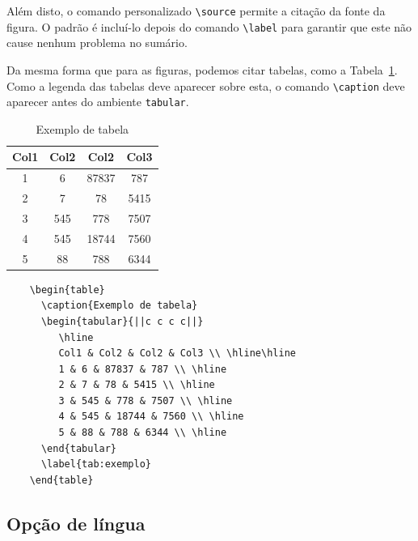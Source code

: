 \documentclass[portugues]{automatex}
\begin{document}
Além disto, o comando personalizado \verb+\source+ permite a citação da fonte da figura. O padrão é incluí-lo depois do comando \verb+\label+ para garantir que este não cause nenhum problema no sumário.

Da mesma forma que para as figuras, podemos citar tabelas, como a Tabela~\ref{tab:exemplo}. Como a legenda das tabelas deve aparecer sobre esta, o comando \verb+\caption+ deve aparecer antes do ambiente \texttt{tabular}.

\begin{table}
  \caption{Exemplo de tabela}
  \begin{tabular}{||c c c c||}
     \hline
     Col1 & Col2 & Col2 & Col3 \\ \hline\hline
     1 & 6 & 87837 & 787 \\ \hline
     2 & 7 & 78 & 5415 \\ \hline
     3 & 545 & 778 & 7507 \\ \hline
     4 & 545 & 18744 & 7560 \\ \hline
     5 & 88 & 788 & 6344 \\ \hline
  \end{tabular}
  \label{tab:exemplo}
\end{table}

\begin{minipage}{\textwidth}
  \begin{verbatim}
    \begin{table}
      \caption{Exemplo de tabela}
      \begin{tabular}{||c c c c||}
         \hline
         Col1 & Col2 & Col2 & Col3 \\ \hline\hline
         1 & 6 & 87837 & 787 \\ \hline
         2 & 7 & 78 & 5415 \\ \hline
         3 & 545 & 778 & 7507 \\ \hline
         4 & 545 & 18744 & 7560 \\ \hline
         5 & 88 & 788 & 6344 \\ \hline
      \end{tabular}
      \label{tab:exemplo}
    \end{table}
  \end{verbatim}
\end{minipage}

\subsection{Opção de língua}
\end{document}
